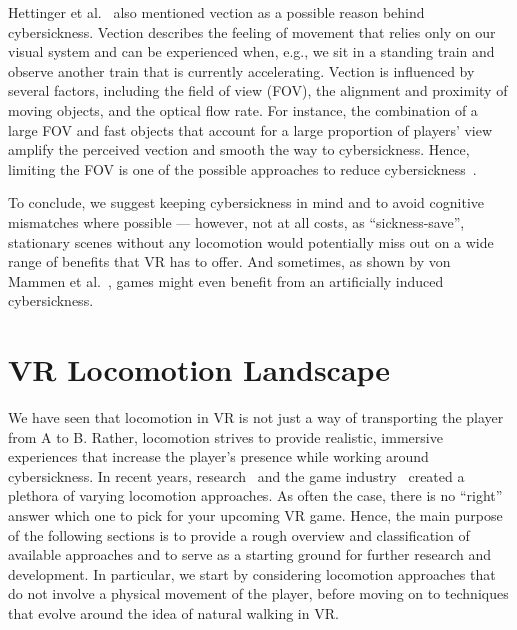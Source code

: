 Hettinger et al.~\cite{hettingerVection} also mentioned vection as a possible reason behind cybersickness. Vection describes the feeling of movement that relies only on our visual system and can be experienced when, e.g., we sit in a standing train and observe another train that is currently accelerating. Vection is influenced by several factors, including the field of view (FOV), the alignment and proximity of moving objects, and the optical flow rate. For instance, the combination of a large FOV and fast objects that account for a large proportion of players' view amplify the perceived vection and smooth the way to cybersickness. Hence, limiting the FOV is one of the possible approaches to reduce cybersickness~\cite{fernandes2016combating,lin2002effects}.


To conclude, we suggest keeping cybersickness in mind and to avoid cognitive mismatches where possible --- however, not at all costs, as ``sickness-save'', stationary scenes without any locomotion would potentially miss out on a wide range of benefits that VR has to offer. And sometimes, as shown by von Mammen et al.~\cite{von2016cyber}, games might even benefit from an artificially induced cybersickness. 







\section{VR Locomotion Landscape}


We have seen that locomotion in VR is not just a way of transporting the player from A to B. Rather, locomotion strives to provide realistic, immersive experiences that increase the player's presence while working around cybersickness. In recent years, research~\cite{boletsis2017new} and the game industry~\cite{Habgood:2017:HLP:3130859.3131437} created a plethora of varying locomotion approaches. As often the case, there is no ``right'' answer which one to pick for your upcoming VR game. Hence, the main purpose of the following sections is to provide a rough overview and classification of available approaches and to serve as a starting ground for further research and development. In particular, we start by considering locomotion approaches that do not involve a physical movement of the player, before moving on to techniques that evolve around the idea of natural walking in VR. 




